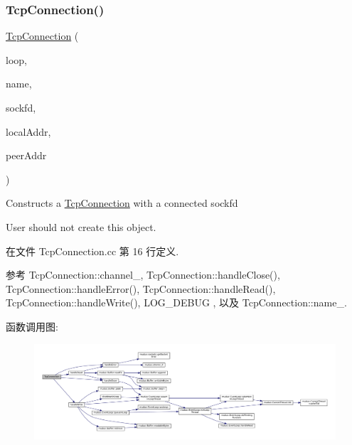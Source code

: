 \subsubsection{\texorpdfstring{Tcp\+Connection()}{TcpConnection()}}
{\footnotesize\ttfamily \hyperlink{classmuduo_1_1TcpConnection}{Tcp\+Connection} (\begin{DoxyParamCaption}\item[{\hyperlink{classmuduo_1_1EventLoop}{Event\+Loop} $\ast$}]{loop,  }\item[{const std\+::string \&}]{name,  }\item[{int}]{sockfd,  }\item[{const \hyperlink{classmuduo_1_1InetAddress}{Inet\+Address} \&}]{local\+Addr,  }\item[{const \hyperlink{classmuduo_1_1InetAddress}{Inet\+Address} \&}]{peer\+Addr }\end{DoxyParamCaption})}

Constructs a \hyperlink{classmuduo_1_1TcpConnection}{Tcp\+Connection} with a connected sockfd

User should not create this object. 

在文件 Tcp\+Connection.\+cc 第 16 行定义.



参考 Tcp\+Connection\+::channel\+\_\+, Tcp\+Connection\+::handle\+Close(), Tcp\+Connection\+::handle\+Error(), Tcp\+Connection\+::handle\+Read(), Tcp\+Connection\+::handle\+Write(), L\+O\+G\+\_\+\+D\+E\+B\+UG , 以及 Tcp\+Connection\+::name\+\_\+.

函数调用图\+:
\nopagebreak
\begin{figure}[H]
\begin{center}
\leavevmode
\includegraphics[width=350pt]{classmuduo_1_1TcpConnection_a239881b2e3d5499da8745fba1bd82e08_cgraph}
\end{center}
\end{figure}
\mbox{\label{classmuduo_1_1TcpConnection_a0a3551d2f9a37ccec8f9cb913e73878a}} 
